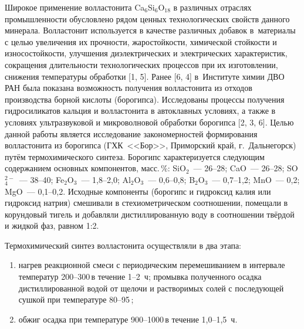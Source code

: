 



\makeProcTitleII


Широкое применение волластонита Ca$_6$Si$_6$O$_{18}$ в различных отраслях промышленности обусловлено рядом ценных технологических свойств данного минерала. Волластонит используется в качестве различных добавок в~материалы с целью увеличения их прочности, жаростойкости, химической стойкости и износостойкости, улучшения диэлектрических и электрических характеристик, сокращения длительности технологических процессов при их изготовлении, снижения температуры обработки [1, 5].
Ранее [6, 4] в~Институте химии ДВО РАН была показана возможность получения волластонита из отходов производства борной кислоты (борогипса). Исследованы процессы получения гидросиликатов кальция и волластонита в автоклавных условиях, а также в условиях ультразвуковой и микроволновой обработки борогипса [2, 3, 6].
Целью данной работы является исследование закономерностей формирования волластонита из борогипса (ГХК~<<Бор>>, Приморский край, г.~Дальнегорск) путём термохимического синтеза.
Борогипс характеризуется следующим содержанием основных компонентов, масс.\,\%: SiO$_2$~--- 26--28; CaO~--- 26--28; SO$_4^{2-}$~--- 38--40; Fe$_2$O$_3$~--- 1,8--2,0; Al$_2$O$_3$~--- 0,6--0,8; B$_2$O$_3$~--- 0,7--1,2; MnO~--- 0,2; MgO~--- 0,1--0,2. Исходные компоненты (борогипс и гидроксид калия или гидроксид натрия) смешивали в стехиометрическом соотношении, помещали в корундовый тигель и добавляли дистиллированную воду в соотношении твёрдой и жидкой фаз, равном 1:2.

Термохимический синтез волластонита осуществляли в два этапа:
\begin{enumerate}[noitemsep]\vspace{-8pt}
  \item нагрев реакционной смеси с периодическим перемешиванием в интервале температур 200--300\,\dgc в течение 1--2~ч; промывка полученного осадка дистиллированной водой от щелочи и растворимых солей с последующей сушкой при температуре 80--95\,\dgc;
    \item обжиг осадка при температуре 900--1000\,\dgc в течение 1,0--1,5~ч.
\end{enumerate}
 \vspace{-8pt}

